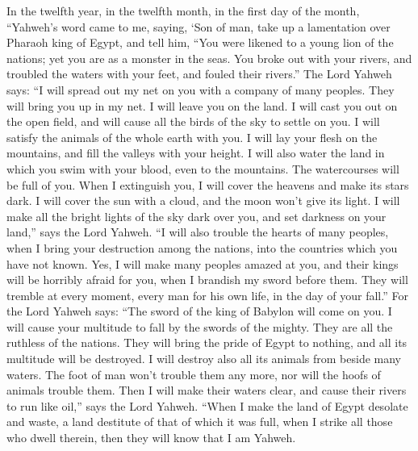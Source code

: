  In the twelfth year, in the twelfth month, in the first day
of the month, ``Yahweh's word came to me, saying,  `Son of
man, take up a lamentation over Pharaoh king of Egypt, and tell him,
``You were likened to a young lion of the nations; yet you are as a
monster in the seas. You broke out with your rivers, and troubled the
waters with your feet, and fouled their rivers.''  The Lord
Yahweh says: ``I will spread out my net on you with a company of many
peoples. They will bring you up in my net.  I will leave you
on the land. I will cast you out on the open field, and will cause all
the birds of the sky to settle on you. I will satisfy the animals of the
whole earth with you.  I will lay your flesh on the
mountains, and fill the valleys with your height.  I will
also water the land in which you swim with your blood, even to the
mountains. The watercourses will be full of you.  When I
extinguish you, I will cover the heavens and make its stars dark. I will
cover the sun with a cloud, and the moon won't give its light.
 I will make all the bright lights of the sky dark over you,
and set darkness on your land,'' says the Lord Yahweh.  ``I
will also trouble the hearts of many peoples, when I bring your
destruction among the nations, into the countries which you have not
known.  Yes, I will make many peoples amazed at you, and
their kings will be horribly afraid for you, when I brandish my sword
before them. They will tremble at every moment, every man for his own
life, in the day of your fall.''  For the Lord Yahweh says:
``The sword of the king of Babylon will come on you.  I
will cause your multitude to fall by the swords of the mighty. They are
all the ruthless of the nations. They will bring the pride of Egypt to
nothing, and all its multitude will be destroyed.  I will
destroy also all its animals from beside many waters. The foot of man
won't trouble them any more, nor will the hoofs of animals trouble them.
 Then I will make their waters clear, and cause their
rivers to run like oil,'' says the Lord Yahweh.  ``When I
make the land of Egypt desolate and waste, a land destitute of that of
which it was full, when I strike all those who dwell therein, then they
will know that I am Yahweh.

